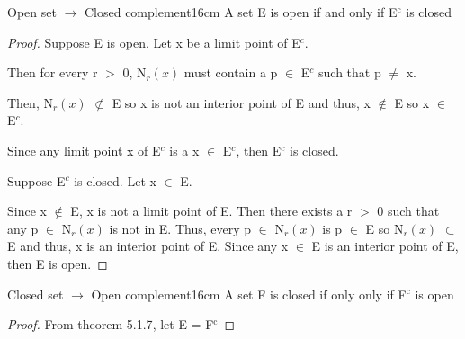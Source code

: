 	\newpage



	\begin{wtheorem}{Open set $\rightarrow$ Closed complement}{16cm}
		A set E is open if and only if E$^\text{c}$ is closed
	\end{wtheorem}
	
	\begin{proof}
		Suppose E is open. Let x be a limit point of E$^c$.

		Then for every r $>$ 0, N$_r(x)$ must contain a p $\in$ E$^c$
		such that p $\neq$ x.

		Then, N$_r(x)$ $\not \subset$ E so x is not an interior point of E and
		thus, x $\not \in$ E so x $\in$ E$^c$.

		Since any limit point x of E$^c$ is a x $\in$ E$^c$, then E$^c$ is closed.

		\vspace{0.2cm}

		Suppose E$^c$ is closed. Let x $\in$ E.

		Since x $\not \in$ E, x is not a limit point of E.
		Then there exists a r $>$ 0 such that any p $\in$ N$_r(x)$ is not in E.
		Thus, every p $\in$ N$_r(x)$ is p $\in$ E so N$_r(x)$ $\subset$ E and thus,
		x is an interior point of E.
		Since any x $\in$ E is an interior point of E, then E is open.
	\end{proof}

	\vspace{0.5cm}



	\begin{corollary}{Closed set $\rightarrow$ Open complement}{16cm}
		A set F is closed if only only if F$^\text{c}$ is open
	\end{corollary}
	
	\begin{proof}
		From {\color{red} theorem 5.1.7}, let E = F$^\text{c}$
	\end{proof}

	\vspace{0.5cm}



